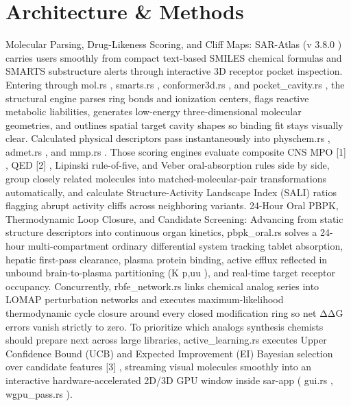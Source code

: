 \documentclass[10pt,letterpaper]{article}
\begin{document}
\section{Architecture \& Methods}
Molecular Parsing, Drug-Likeness Scoring, and Cliff Maps: SAR-Atlas (v 3.8.0 ) carries users smoothly from compact text-based SMILES chemical formulas and SMARTS substructure alerts through interactive 3D receptor pocket inspection. Entering through mol.rs , smarts.rs , conformer3d.rs , and pocket\_cavity.rs , the structural engine parses ring bonds and ionization centers, flags reactive metabolic liabilities, generates low-energy three-dimensional molecular geometries, and outlines spatial target cavity shapes so binding fit stays visually clear. Calculated physical descriptors pass instantaneously into physchem.rs , admet.rs , and mmp.rs . Those scoring engines evaluate composite CNS MPO [1] , QED [2] , Lipinski rule-of-five, and Veber oral-absorption rules side by side, group closely related molecules into matched-molecular-pair transformations automatically, and calculate Structure-Activity Landscape Index (SALI) ratios flagging abrupt activity cliffs across neighboring variants. 24-Hour Oral PBPK, Thermodynamic Loop Closure, and Candidate Screening: Advancing from static structure descriptors into continuous organ kinetics, pbpk\_oral.rs solves a 24-hour multi-compartment ordinary differential system tracking tablet absorption, hepatic first-pass clearance, plasma protein binding, active efflux reflected in unbound brain-to-plasma partitioning (K p,uu ), and real-time target receptor occupancy. Concurrently, rbfe\_network.rs links chemical analog series into LOMAP perturbation networks and executes maximum-likelihood thermodynamic cycle closure around every closed modification ring so net ΔΔG errors vanish strictly to zero. To prioritize which analogs synthesis chemists should prepare next across large libraries, active\_learning.rs executes Upper Confidence Bound (UCB) and Expected Improvement (EI) Bayesian selection over candidate features [3] , streaming visual molecules smoothly into an interactive hardware-accelerated 2D/3D GPU window inside sar-app ( gui.rs , wgpu\_pass.rs ).
\end{document}
